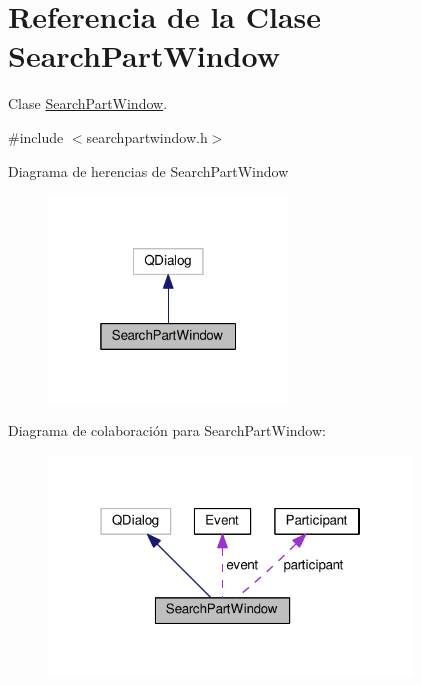 \hypertarget{class_search_part_window}{}\section{Referencia de la Clase Search\+Part\+Window}
\label{class_search_part_window}


Clase \hyperlink{class_search_part_window}{Search\+Part\+Window}.  




{\ttfamily \#include $<$searchpartwindow.\+h$>$}



Diagrama de herencias de Search\+Part\+Window\nopagebreak
\begin{figure}[H]
\begin{center}
\leavevmode
\includegraphics[width=181pt]{class_search_part_window__inherit__graph}
\end{center}
\end{figure}


Diagrama de colaboración para Search\+Part\+Window\+:\nopagebreak
\begin{figure}[H]
\begin{center}
\leavevmode
\includegraphics[width=274pt]{class_search_part_window__coll__graph}
\end{center}
\end{figure}

